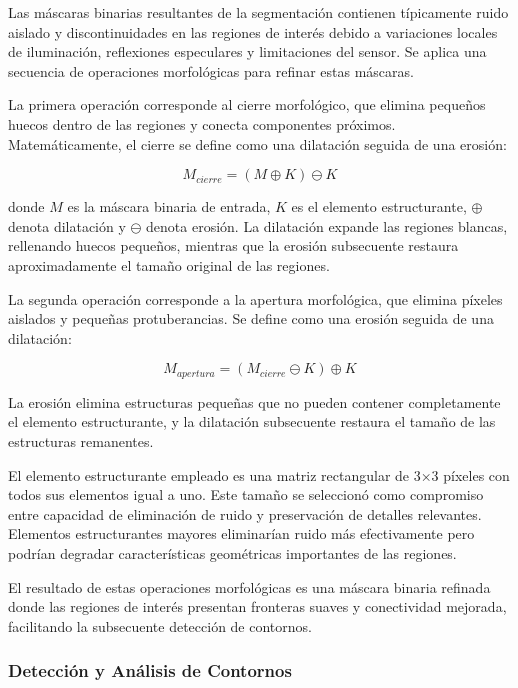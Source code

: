 Las máscaras binarias resultantes de la segmentación contienen típicamente ruido aislado y discontinuidades en las regiones de interés debido a variaciones locales de iluminación, reflexiones especulares y limitaciones del sensor. Se aplica una secuencia de operaciones morfológicas para refinar estas máscaras.

La primera operación corresponde al cierre morfológico, que elimina pequeños huecos dentro de las regiones y conecta componentes próximos. Matemáticamente, el cierre se define como una dilatación seguida de una erosión:

\begin{equation}
M_{cierre} = (M \oplus K) \ominus K
\end{equation}

donde $M$ es la máscara binaria de entrada, $K$ es el elemento estructurante, $\oplus$ denota dilatación y $\ominus$ denota erosión. La dilatación expande las regiones blancas, rellenando huecos pequeños, mientras que la erosión subsecuente restaura aproximadamente el tamaño original de las regiones.

La segunda operación corresponde a la apertura morfológica, que elimina píxeles aislados y pequeñas protuberancias. Se define como una erosión seguida de una dilatación:

\begin{equation}
M_{apertura} = (M_{cierre} \ominus K) \oplus K
\end{equation}

La erosión elimina estructuras pequeñas que no pueden contener completamente el elemento estructurante, y la dilatación subsecuente restaura el tamaño de las estructuras remanentes.

El elemento estructurante empleado es una matriz rectangular de 3×3 píxeles con todos sus elementos igual a uno. Este tamaño se seleccionó como compromiso entre capacidad de eliminación de ruido y preservación de detalles relevantes. Elementos estructurantes mayores eliminarían ruido más efectivamente pero podrían degradar características geométricas importantes de las regiones.

El resultado de estas operaciones morfológicas es una máscara binaria refinada donde las regiones de interés presentan fronteras suaves y conectividad mejorada, facilitando la subsecuente detección de contornos.

\subsubsection{Detección y Análisis de Contornos}

